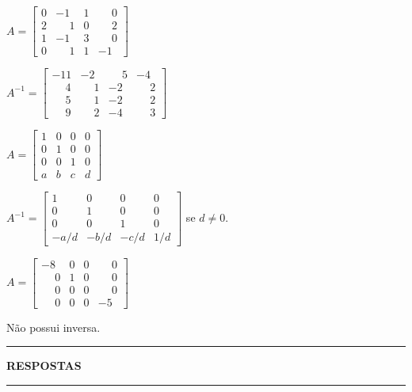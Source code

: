 \documentclass[12pt]{exam}
\begin{document}
\begin{exercicio}
    $
    A = \begin{bmatrix}
        0 & -1 & 1 & \phantom{-}0\\
        2 & \phantom{-}1 & 0 & \phantom{-}2\\
        1 & -1 & 3 & \phantom{-}0\\
        0 & \phantom{-}1 & 1 & -1
    \end{bmatrix}
    $
    \begin{solucao}
        $
        A^{-1} = \begin{bmatrix}
            -11 & -2 & \phantom{-}5 & -4\\
            \phantom{-}4 & \phantom{-}1 & -2 & \phantom{-}2\\
            \phantom{-}5 & \phantom{-}1 & -2 & \phantom{-}2\\
            \phantom{-}9 & \phantom{-}2 & -4 & \phantom{-}3
        \end{bmatrix}
        $
    \end{solucao}
\end{exercicio}

\begin{exercicio}
    $
    A = \begin{bmatrix}
        1 & 0 & 0 & 0\\
        0 & 1 & 0 & 0\\
        0 & 0 & 1 & 0\\
        a & b & c & d
    \end{bmatrix}
    $
    \begin{solucao}
        $
        A^{-1} = \begin{bmatrix}
            1 & 0 & 0 & 0\\
            0 & 1 & 0 & 0\\
            0 & 0 & 1 & 0\\
            -a/d & -b/d & -c/d & 1/d
        \end{bmatrix}
        $
        se $d \ne 0$.
    \end{solucao}
\end{exercicio}

\begin{exercicio}\label{matrizinversafim}
    $
    A =\begin{bmatrix}
        -8 & 0 & 0 & \phantom{-} 0\\
        \phantom{-} 0 & 1 & 0 & \phantom{-} 0\\
        \phantom{-} 0 & 0 & 0 & \phantom{-} 0\\
        \phantom{-} 0 & 0 & 0 & -5
    \end{bmatrix}
    $
    \begin{solucao}
        Não possui inversa.
    \end{solucao}
\end{exercicio}

\newpage
{}
\hrule
\begin{center}
{\large\bf RESPOSTAS}
\end{center}
\hrule

\end{document}
